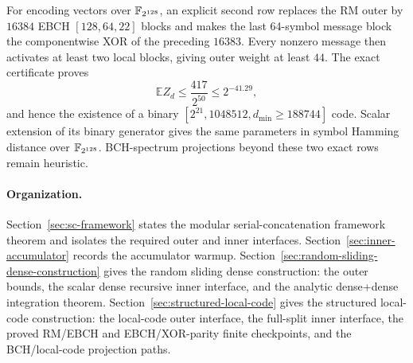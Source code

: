 For encoding vectors over \(\mathbb{F}_{2^{128}}\), an explicit second row replaces
the RM outer by \(16384\) EBCH \([128,64,22]\) blocks and makes the last
64-symbol message block the componentwise XOR of the preceding \(16383\).
Every nonzero message then activates at least two local blocks, giving outer
weight at least \(44\).  The exact certificate proves
\[
 \mathbb E Z_d\le\frac{417}{2^{50}}\le2^{-41.29},
\]
and hence the existence of a binary
\([2^{21},1048512,d_{\min}\ge188744]\) code.  Scalar extension of its binary
generator gives the same parameters in symbol Hamming distance over
\(\mathbb{F}_{2^{128}}\).  BCH-spectrum projections beyond these two exact rows remain
heuristic.

\paragraph{Organization.}
Section~\ref{sec:sc-framework} states the modular serial-concatenation framework theorem and isolates the required outer and inner interfaces.
Section~\ref{sec:inner-accumulator} records the accumulator warmup.
Section~\ref{sec:random-sliding-dense-construction} gives the random sliding
dense construction: the outer bounds, the scalar dense recursive inner
interface, and the analytic dense+dense integration theorem.
Section~\ref{sec:structured-local-code} gives the structured local-code
construction: the local-code outer interface, the full-split inner interface,
the proved RM/EBCH and EBCH/XOR-parity finite checkpoints, and the
BCH/local-code projection paths.
